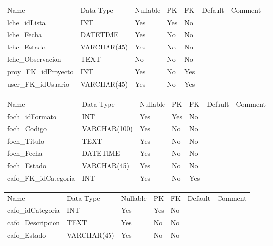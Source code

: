 			\begin{center}
				\begin{tabular}{ |l|l|l|l|l|l|l| }
					\hline
					Name & Data Type & Nullable & PK & FK & Default & Comment \\
					lche_idLista & INT & Yes & Yes & No &  & \\ \hline 
lche_Fecha & DATETIME & Yes & No & No &  & \\ \hline 
lche_Estado & VARCHAR(45) & Yes & No & No &  & \\ \hline 
lche_Observacion & TEXT & No & No & No &  & \\ \hline 
proy_FK_idProyecto & INT & Yes & No & Yes &  & \\ \hline 
user_FK_idUsuario & VARCHAR(45) & Yes & No & Yes &  & \\ \hline 

				\end{tabular}
			\end{center}
		

			\begin{center}
				\begin{tabular}{ |l|l|l|l|l|l|l| }
					\hline
					Name & Data Type & Nullable & PK & FK & Default & Comment \\
					foch_idFormato & INT & Yes & Yes & No &  & \\ \hline 
foch_Codigo & VARCHAR(100) & Yes & No & No &  & \\ \hline 
foch_Titulo & TEXT & Yes & No & No &  & \\ \hline 
foch_Fecha & DATETIME & Yes & No & No &  & \\ \hline 
foch_Estado & VARCHAR(45) & Yes & No & No &  & \\ \hline 
cafo_FK_idCategoria & INT & Yes & No & Yes &  & \\ \hline 

				\end{tabular}
			\end{center}
		

			\begin{center}
				\begin{tabular}{ |l|l|l|l|l|l|l| }
					\hline
					Name & Data Type & Nullable & PK & FK & Default & Comment \\
					cafo_idCategoria & INT & Yes & Yes & No &  & \\ \hline 
cafo_Descripcion & TEXT & Yes & No & No &  & \\ \hline 
cafo_Estado & VARCHAR(45) & Yes & No & No &  & \\ \hline 

				\end{tabular}
			\end{center}
		

